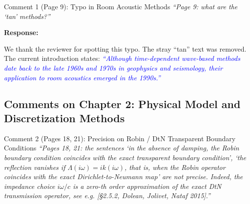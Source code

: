 \documentclass[11pt,a4paper]{article}
\newenvironment{response}{
    \par\vspace{1mm}\noindent\textbf{\textcolor{responseframe}{Response:}}\par\vspace{1mm}
}{
    \par\vspace{3mm}
}
\begin{document}
\begin{revcomment}{Comment 1 (Page 9): Typo in Room Acoustic Methods}
\emph{``Page 9: what are the `tan' methods?''}
\end{revcomment}

\begin{response}
We thank the reviewer for spotting this typo. The stray ``tan'' text was removed. The current introduction states: \textcolor{blue}{\emph{``Although time-dependent wave-based methods date back to the late 1960s and 1970s in geophysics and seismology, their application to room acoustics emerged in the 1990s.''}}
\end{response}

\subsection{Comments on Chapter 2: Physical Model and Discretization Methods}

\begin{revcomment}{Comment 2 (Pages 18, 21): Precision on Robin / DtN Transparent Boundary Conditions}
\emph{``Pages 18, 21: the sentences `in the absence of damping, the Robin boundary condition coincides with the exact transparent boundary condition', `the reflection vanishes if $\Lambda(i\omega) = ik(i\omega)$, that is, when the Robin operator coincides with the exact Dirichlet-to-Neumann map' are not precise. Indeed, the impedance choice $i\omega/c$ is a zero-th order approximation of the exact DtN transmission operator, see e.g. [\S2.5.2, Dolean, Jolivet, Nataf 2015].''}
\end{revcomment}
\end{document}
